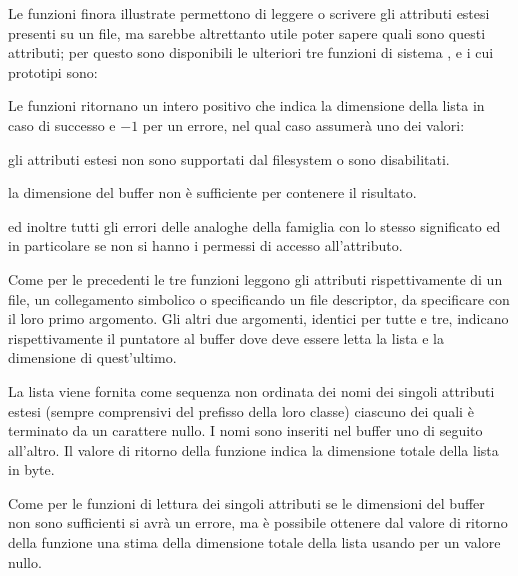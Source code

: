 Le funzioni finora illustrate permettono di leggere o scrivere gli attributi
estesi presenti su un file, ma sarebbe altrettanto utile poter sapere quali
sono questi attributi; per questo sono disponibili le ulteriori tre funzioni
di sistema ,  e  i cui
prototipi sono:

\begin{funcproto}{
}

{Le funzioni ritornano un intero positivo che indica la dimensione della lista
  in caso di successo e $-1$ per un errore, nel qual caso  assumerà
  uno dei valori:
  \begin{errlist}
  \item[\errcode{ENOTSUP}] gli attributi estesi non sono supportati dal
    filesystem o sono disabilitati.
  \item[\errcode{ERANGE}] la dimensione  del buffer 
    non è sufficiente per contenere il risultato.
  \end{errlist}
  ed inoltre tutti gli errori delle analoghe della famiglia  con lo
  stesso significato ed in particolare  se non si hanno i
  permessi di accesso all'attributo.}
\end{funcproto}

Come per le precedenti le tre funzioni leggono gli attributi rispettivamente
di un file, un collegamento simbolico o specificando un file descriptor, da
specificare con il loro primo argomento. Gli altri due argomenti, identici per
tutte e tre, indicano rispettivamente il puntatore  al buffer dove
deve essere letta la lista e la dimensione  di quest'ultimo.

La lista viene fornita come sequenza non ordinata dei nomi dei singoli
attributi estesi (sempre comprensivi del prefisso della loro classe) ciascuno
dei quali è terminato da un carattere nullo. I nomi sono inseriti nel buffer
uno di seguito all'altro. Il valore di ritorno della funzione indica la
dimensione totale della lista in byte.

Come per le funzioni di lettura dei singoli attributi se le dimensioni del
buffer non sono sufficienti si avrà un errore, ma è possibile ottenere dal
valore di ritorno della funzione una stima della dimensione totale della lista
usando per  un valore nullo. 

